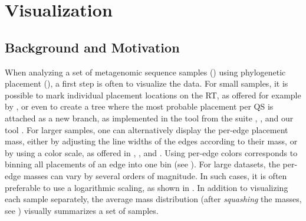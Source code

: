 
\chapter{Visualization}
\label{ch:Visualization}



\section{Background and Motivation}
\label{ch:Visualization:sec:Motivation}

When analyzing a set of metagenomic sequence samples ()
using phylogenetic placement (),
a first step is often to visualize the data.
For small samples, it is possible to mark individual placement locations on the \acf{RT},
as offered for example by  \cite{Letunic2016},
or even to create a tree where the most probable placement per \acf{QS} is attached as a new branch,
as implemented in the  tool from the  suite \cite{Matsen2010},
 \cite{Berger2011,Stamatakis2014}, and our tool .
For larger samples, one can alternatively display the per-edge placement mass,
either by adjusting the line widths of the edges according to their mass, or by using a color scale,
as offered in  \cite{Yu2017}, , and .
Using per-edge colors corresponds to binning all placements of an edge into one bin
(see ).
For large datasets, the per-edge masses can vary by several orders of magnitude.
In such cases, it is often preferable to use a logarithmic scaling, as shown in .
In addition to visualizing each sample separately, the average mass distribution
(after \emph{squashing} the masses,
see )
visually summarizes a set of samples.

